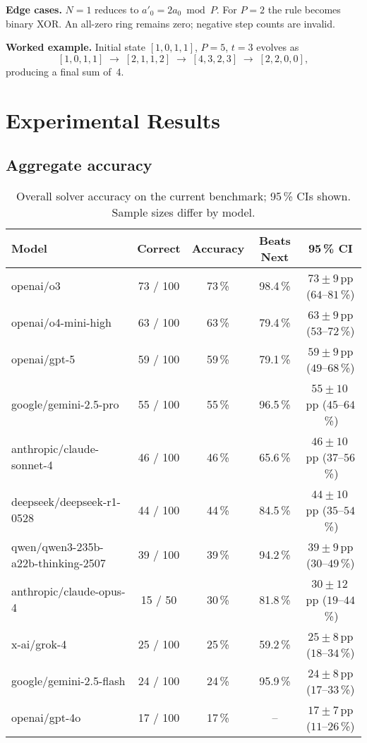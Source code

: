 \documentclass[11pt]{article}
\begin{document}
\textbf{Edge cases.} $N{=}1$ reduces to $a'_0 = 2a_0 \bmod P$. For $P{=}2$ the rule becomes binary XOR. An all-zero ring remains zero; negative step counts are invalid.

\textbf{Worked example.} Initial state $[1,0,1,1]$, $P=5$, $t=3$ evolves as
\[
[1,0,1,1]\;\rightarrow\;[2,1,1,2]\;\rightarrow\;[4,3,2,3]\;\rightarrow\;[2,2,0,0],
\]
producing a final sum of~4.

\section{Experimental Results}
\label{sec:results}
\subsection{Aggregate accuracy}
\begin{table}[H]
\centering
\begin{tabular}{lcccc}
\toprule
Model & Correct & Accuracy & Beats Next & 95\,\% CI \\ \midrule
openai/o3                                 & 73 / 100 & 73\,\% & 98.4\,\% & $73\pm9$\,pp ($64$--$81$\,\%) \\
openai/o4-mini-high                       & 63 / 100 & 63\,\% & 79.4\,\% & $63\pm9$\,pp ($53$--$72$\,\%) \\
openai/gpt-5                              & 59 / 100 & 59\,\% & 79.1\,\% & $59\pm9$\,pp ($49$--$68$\,\%) \\
google/gemini-2.5-pro                     & 55 / 100 & 55\,\% & 96.5\,\% & $55\pm10$\,pp ($45$--$64$\,\%) \\
anthropic/claude-sonnet-4                 & 46 / 100 & 46\,\% & 65.6\,\% & $46\pm10$\,pp ($37$--$56$\,\%) \\
deepseek/deepseek-r1-0528                 & 44 / 100 & 44\,\% & 84.5\,\% & $44\pm10$\,pp ($35$--$54$\,\%) \\
qwen/qwen3-235b-a22b-thinking-2507        & 39 / 100 & 39\,\% & 94.2\,\% & $39\pm9$\,pp ($30$--$49$\,\%) \\
anthropic/claude-opus-4                   & 15 / 50  & 30\,\% & 81.8\,\% & $30\pm12$\,pp ($19$--$44$\,\%) \\
x-ai/grok-4                               & 25 / 100 & 25\,\% & 59.2\,\% & $25\pm8$\,pp ($18$--$34$\,\%) \\
google/gemini-2.5-flash                   & 24 / 100 & 24\,\% & 95.9\,\% & $24\pm8$\,pp ($17$--$33$\,\%) \\
openai/gpt-4o                             & 17 / 100 & 17\,\% & -- & $17\pm7$\,pp ($11$--$26$\,\%) \\
\bottomrule
\end{tabular}
\caption{Overall solver accuracy on the current benchmark; 95\,\% CIs shown. Sample sizes differ by model.}
\end{table}
\FloatBarrier
\end{document}
